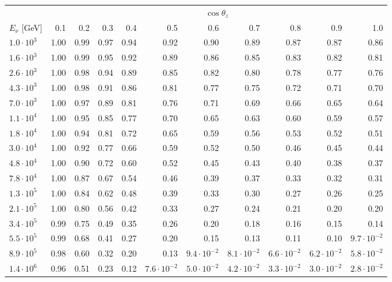 \documentclass[aps,prd,showpacs,letterpaper,onecolumn,longbibliography,superscriptaddress,notitlepage,nofootinbib]{revtex4-1}%
\begin{document}
\begin{table}[h!]
\centering
\begin{tabular*}{\textwidth}{l @{\extracolsep{\fill}} r r r r r r r r r r}
\toprule
& \multicolumn{10}{c}{$\cos \theta_z$}\\
\cmidrule{2-11}
$E_\nu$ [GeV] & 0.1 & 0.2 & 0.3 & 0.4 & 0.5 & 0.6 & 0.7 & 0.8 & 0.9 & 1.0 \\ 
\midrule
$1.0\cdot10^{3}$ & 1.00 & 0.99 & 0.97 & 0.94 & 0.92 & 0.90 & 0.89 & 0.87 & 0.87 & 0.86 \\ \hline
$1.6\cdot10^{3}$ & 1.00 & 0.99 & 0.95 & 0.92 & 0.89 & 0.86 & 0.85 & 0.83 & 0.82 & 0.81 \\ \hline
$2.6\cdot10^{3}$ & 1.00 & 0.98 & 0.94 & 0.89 & 0.85 & 0.82 & 0.80 & 0.78 & 0.77 & 0.76 \\ \hline
$4.3\cdot10^{3}$ & 1.00 & 0.98 & 0.91 & 0.86 & 0.81 & 0.77 & 0.75 & 0.72 & 0.71 & 0.70 \\ \hline
$7.0\cdot10^{3}$ & 1.00 & 0.97 & 0.89 & 0.81 & 0.76 & 0.71 & 0.69 & 0.66 & 0.65 & 0.64 \\ \hline
$1.1\cdot10^{4}$ & 1.00 & 0.95 & 0.85 & 0.77 & 0.70 & 0.65 & 0.63 & 0.60 & 0.59 & 0.57 \\ \hline
$1.8\cdot10^{4}$ & 1.00 & 0.94 & 0.81 & 0.72 & 0.65 & 0.59 & 0.56 & 0.53 & 0.52 & 0.51 \\ \hline
$3.0\cdot10^{4}$ & 1.00 & 0.92 & 0.77 & 0.66 & 0.59 & 0.52 & 0.50 & 0.46 & 0.45 & 0.44 \\ \hline
$4.8\cdot10^{4}$ & 1.00 & 0.90 & 0.72 & 0.60 & 0.52 & 0.45 & 0.43 & 0.40 & 0.38 & 0.37 \\ \hline
$7.8\cdot10^{4}$ & 1.00 & 0.87 & 0.67 & 0.54 & 0.46 & 0.39 & 0.37 & 0.33 & 0.32 & 0.31 \\ \hline
$1.3\cdot10^{5}$ & 1.00 & 0.84 & 0.62 & 0.48 & 0.39 & 0.33 & 0.30 & 0.27 & 0.26 & 0.25 \\ \hline
$2.1\cdot10^{5}$ & 1.00 & 0.80 & 0.56 & 0.42 & 0.33 & 0.27 & 0.24 & 0.21 & 0.20 & 0.20 \\ \hline
$3.4\cdot10^{5}$ & 0.99 & 0.75 & 0.49 & 0.35 & 0.26 & 0.20 & 0.18 & 0.16 & 0.15 & 0.14 \\ \hline
$5.5\cdot10^{5}$ & 0.99 & 0.68 & 0.41 & 0.27 & 0.20 & 0.15 & 0.13 & 0.11 & 0.10 & $9.7\cdot10^{-2}$ \\ \hline
$8.9\cdot10^{5}$ & 0.98 & 0.60 & 0.32 & 0.20 & 0.13 & $9.4\cdot10^{-2}$ & $8.1\cdot10^{-2}$ & $6.6\cdot10^{-2}$ & $6.2\cdot10^{-2}$ & $5.8\cdot10^{-2}$ \\ \hline
$1.4\cdot10^{6}$ & 0.96 & 0.51 & 0.23 & 0.12 & $7.6\cdot10^{-2}$ & $5.0\cdot10^{-2}$ & $4.2\cdot10^{-2}$ & $3.3\cdot10^{-2}$ & $3.0\cdot10^{-2}$ & $2.8\cdot10^{-2}$ \\ \hline

\end{tabular*}
\end{table}
\end{document}
